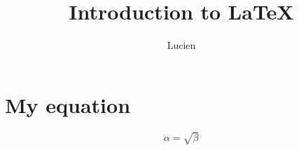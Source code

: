 

\title{Introduction to \LaTeX{}}
\author{Lucien}

\maketitle

\section{My equation}
\begin{equation}
    \label{simple_equation}
    \alpha = \sqrt{ \beta }
\end{equation}

